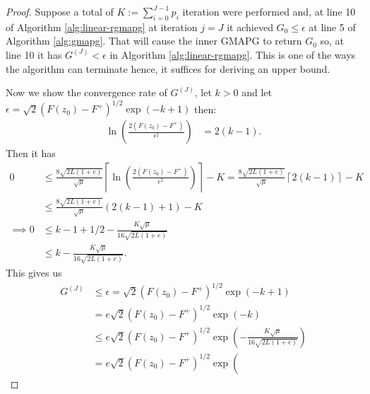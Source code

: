\documentclass[12pt]{report}
\begin{document}
        \begin{proof}
            Suppose a total of $K := \sum_{i = 0}^{J - 1} p_i$ iteration were performed and, at line 10 of Algorithm \ref{alg:linear-rgmapg} at iteration $j = J$ it achieved $G_0 \le \epsilon$ at line 5 of Algorithm \ref{alg:gmapg}. 
            That will cause the inner GMAPG to return $G_0$ so, at line 10 it has $G^{(J)} < \epsilon$ in Algorithm \ref{alg:linear-rgmapg}. 
            This is one of the ways the algorithm can terminate hence, it suffices for deriving an upper bound. 
            \par
            Now we show the convergence rate of $G^{(J)}$, let $k > 0$ and let $\epsilon = \sqrt{2}(F(z_0) - F^+)^{1/2}\exp(-k + 1)$ then: 
            \begin{align*}
                \ln \left(
                    \frac{2(F(z_0) - F^+)}{\epsilon^2}
                \right)
                &= 2(k - 1). 
            \end{align*}
            Then it has 
            \begin{align*}
                0 &\le 
                \frac{8\sqrt{2L(1 + e)}}{\sqrt{\mu}}\left\lceil 
                    \ln\left(
                        \frac{2(F(z_0) - F^+)}{\epsilon^2}
                    \right)
                \right\rceil - K
                =
                \frac{8\sqrt{2L(1 + e)}}{\sqrt{\mu}}\left\lceil 
                    2(k - 1)
                \right\rceil - K 
                \\
                &\le 
                \frac{8\sqrt{2L(1 + e)}}{\sqrt{\mu}} (2(k - 1) + 1) - K
                \\
                \implies
                0 &\le k - 1 + 1/2 - \frac{K\sqrt{\mu}}{16\sqrt{2L(1 + e)}}
                \\
                &\le k - \frac{K\sqrt{\mu}}{16\sqrt{2L(1 + e)}} .
            \end{align*}
            This gives us 
            \begin{align*}
                G^{(J)} &\le \epsilon = \sqrt{2}(F(z_0) - F^+)^{1/2}\exp(-k + 1)
                \\
                &=
                e\sqrt{2}(F(z_0) - F^+)^{1/2}\exp(-k)
                \\
                &\le
                e\sqrt{2}(F(z_0) - F^+)^{1/2}\exp\left(
                    - \frac{K\sqrt{\mu}}{16\sqrt{2L(1 + e)}}
                \right)
                \\
                &= e\sqrt{2}(F(z_0) - F^+)^{1/2}\exp\left(

\end{align*}
\end{proof}
\end{document}
